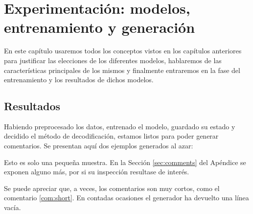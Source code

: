 \chapter{Experimentación: modelos, \\entrenamiento y generación}

En este capítulo usaremos todos los conceptos vistos en los capítulos anteriores para justificar las elecciones de los diferentes modelos, hablaremos de las características principales de los mismos y finalmente entraremos en la fase del entrenamiento y los resultados de dichos modelos.







\section{Resultados}

Habiendo preprocesado los datos, entrenado el modelo, guardado su estado y decidido el método de decodificación, estamos listos para poder generar comentarios. Se presentan aquí dos ejemplos generados al azar:

\begin{thm}
\end{thm}
\begin{thm}
\end{thm}

Esto es solo una pequeña muestra. En la  Sección \ref{sec:comments} del Apéndice se exponen alguno más, por si su inspección resultase de interés. 

Se puede apreciar que, a veces, los comentarios son muy cortos, como el comentario \ref{com:short}. En contadas ocasiones el generador ha devuelto una línea vacía. 

